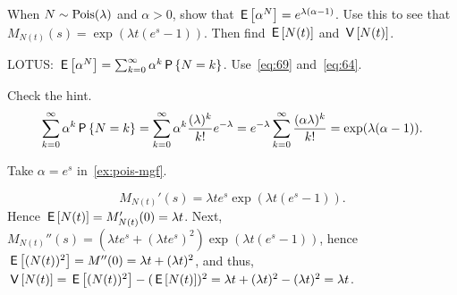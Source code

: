 \documentclass[queueing-book.tex]{subfiles}
\begin{document}
\begin{exercise}\label{ex:pois-mgf}
When $N \sim \Pois{\lambda}$ and $\alpha > 0$, show that $\E{\alpha^{N}} = e^{\lambda(\alpha-1)}$.
Use this to see that $M_{N(t)}(s) = \exp{(\lambda t(e^s-1))}$. Then  find $\E{N(t)}$ and $\V{N(t)}$.
\begin{hint}
LOTUS: $\E{\alpha^{N}} = \sum_{k=0}^\infty \alpha^{k} \P{N=k}$. Use~\cref{eq:69} and~\cref{eq:64}.
\end{hint}
\begin{solution}
Check the hint.
\begin{align*}
\sum_{k=0}^\infty \alpha^{k} \P{N=k} = \sum_{k=0}^\infty \alpha^{k} \frac{(\lambda)^k}{k!} e^{-\lambda}
= e^{-\lambda} \sum_{k=0}^\infty \frac{(\alpha \lambda)^k}{k!} =\exp(\lambda (\alpha - 1)).
\end{align*}

Take $\alpha=e^{s}$ in~\cref{ex:pois-mgf}.

 \begin{equation*}
 M_{N(t)}'(s) = \lambda t e^s \exp(\lambda t(e^s - 1)).
 \end{equation*}
 Hence $\E{N(t)} = M_{N(t)}'(0) = \lambda t $.
Next, $M_{N(t)}''(s) = (\lambda t e^s + (\lambda t e^s)^2) \exp(\lambda t(e^s - 1))$, hence $\E{(N(t))^2} = M''(0) = \lambda t + (\lambda t)^2$, and thus, $\V{N(t)} =\E{(N(t))^2}-(\E{N(t)})^2 = \lambda t + (\lambda t)^2 - (\lambda t)^2 = \lambda t$.

\end{solution}
\end{exercise}
\end{document}
